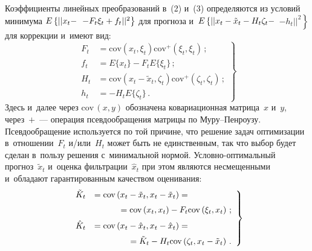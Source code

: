 \begin{multicols}{2}
    Коэффициенты линейных преобразований в~(2) и~(3) определяются из 
условий минимума $E\left\{ \vert \vert x_t\hm-\right.$\linebreak
$\left. - F_t\xi_t\hm+ f_t\vert 
\vert^2\right\}$ для прогноза и~$E\left\{ \vert\vert x_t\hm- \tilde{x}_t\hm- 
H_t\zeta_t\hm-\right.$\linebreak
$\left. -  h_t\vert\vert^2\right\}$ для коррекции и~имеют вид:
    \begin{equation}
    \left.
    \begin{array}{rl}
    F_t &= \mathrm{cov} \left( x_t, \xi_t\right) \mathrm{cov}^+\left( \xi_t,\xi_t\right)\,;\\[6pt]
    f_t&=E\{x_t\}- F_t E\{\xi_t\}\,;\\[6pt]
    H_t &= \mathrm{cov} \left( x_t-\tilde{x}_t, \zeta_t\right) 
    \mathrm{cov}^+ \left(\zeta_t, \zeta_t\right)\,;\\[6pt]
     h_t&=- H_t E\{ \zeta_t\}\,.
    \end{array}
    \right\}
    \label{e4-bos}
    \end{equation}
       Здесь и~далее через $\mathrm{cov}\,(x,y)$ обозначена ковариационная матрица~$x$ 
и~$y$, через~$+$~--- операция псевдообращения матрицы по  
Му\-ру--Пен\-роу\-зу. Псевдообращение используется по той причине, что\linebreak 
решение задач оптимизации в~отношении~$F_t$ и/или~$H_t$ может быть не 
единственным, так что выбор будет сделан в~пользу решения с~минимальной 
нормой.
    Услов\-но-оп\-ти\-маль\-ный прогноз~$\tilde{x}_t$ и~оценка 
фильтрации~$\hat{x}_t$ при этом являются несмещенными и~обладают 
гарантированным качеством оценивания:
    \begin{equation}
    \left.
    \begin{array}{rl}
    \tilde{K}_t&= \mathrm{cov}\left( x_t-\tilde{x}_t, x_t-\tilde{x}_t\right)={}\\[6pt]
    &\hspace*{10mm}{}=\mathrm{cov} \left( x_t, x_t\right) - F_t \mathrm{cov} \left( \xi_t, x_t\right)\,;\\[6pt]
    \hat{K}_t &= \mathrm{cov} \left( x_t-\hat{x}_t, x_t-\hat{x}_t\right) ={}\\[6pt]
    &\hspace*{14mm}{}=\tilde{K}_t-H_t  \mathrm{cov}\left( \zeta_t, x_t-\tilde{x}_t\right)\,.
    \end{array}
    \right\}
    \label{e5-bos}
    \end{equation}
    

\end{multicols}
